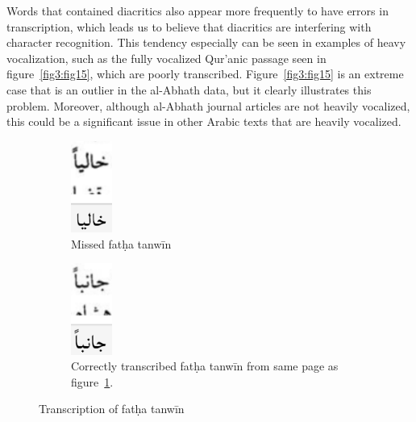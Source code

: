 Words that contained diacritics also appear more frequently to have errors in
transcription, which leads us to believe that diacritics are interfering with
character recognition. This tendency especially can be seen in examples of
heavy vocalization, such as the fully vocalized Qur’anic passage seen in
figure~\ref{fig3:fig15}, which are poorly transcribed. Figure~\ref{fig3:fig15}
is an extreme case that is an outlier in the al-Abhath data, but it clearly
illustrates this problem.  Moreover, although al-Abhath journal articles are
not heavily vocalized, this could be a significant issue in other Arabic texts
that are heavily vocalized. 

\begin{figure}
	\centering
	\begin{subfigure}[t]{0.45\linewidth}
		\centering
	\includegraphics[height=3cm]{images/image3.png}
	\caption{Missed fatḥa tanwīn}
  	\label{fig3:fig16}
	\end{subfigure}
	\begin{subfigure}[t]{0.45\linewidth}
	\centering
	\includegraphics[height=3cm]{images/image1.png}
	\caption{Correctly transcribed fatḥa tanwīn from same page as figure~\protect\ref{fig3:fig16}.}
  	\label{fig3:fig17}
	\end{subfigure}
	\caption{Transcription of fatḥa tanwīn}
\end{figure}

